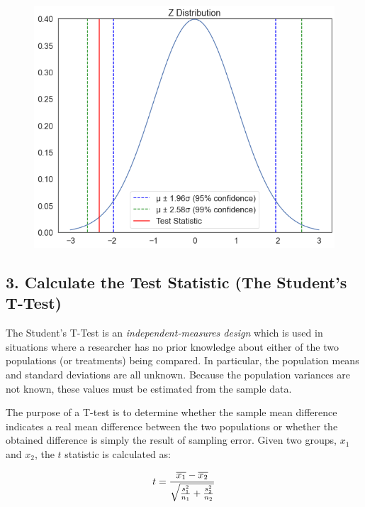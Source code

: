 \documentclass[
  letterpaper,
  DIV=11,
  numbers=noendperiod]{scrreprt}
\begin{document}
\begin{figure}[H]

{\centering \includegraphics{notebooks/W07. Hypothesis Testing_files/figure-pdf/cell-10-output-1.png}

}

\end{figure}

\hypertarget{calculate-the-test-statistic-the-students-t-test}{%
\subsection{3. Calculate the Test Statistic (The Student's
T-Test)}\label{calculate-the-test-statistic-the-students-t-test}}

The Student's T-Test is an \emph{independent-measures design} which is
used in situations where a researcher has no prior knowledge about
either of the two populations (or treatments) being compared. In
particular, the population means and standard deviations are all
unknown. Because the population variances are not known, these values
must be estimated from the sample data.

The purpose of a T-test is to determine whether the sample mean
difference indicates a real mean difference between the two populations
or whether the obtained difference is simply the result of sampling
error. Given two groups, \(x_1\) and \(x_2\), the \(t\) statistic is
calculated as:

\[ \Huge t = {\frac{\overline{x_1}-\overline{x_2}} {\sqrt{\frac{s^2_1}{n_1} + \frac{s^2_2}{n_2}}}} \]
\end{document}
